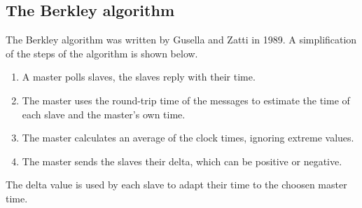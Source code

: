 \subsection{The Berkley algorithm}
\label{sec:berkley}
The Berkley algorithm was written by Gusella and Zatti in 1989. A simplification of the steps of the algorithm is shown below. 

\begin{enumerate}
\item A master polls slaves, the slaves reply with their time.
\item The master uses the round-trip time of the messages to estimate the time of each slave and the master's own time.
\item The master calculates an average of the clock times, ignoring extreme values.
\item The master sends the slaves their delta, which can be positive or negative. 
\end{enumerate}
\label{fig:mifare-auth}

The delta value is used by each slave to adapt their time to the choosen master time. 

